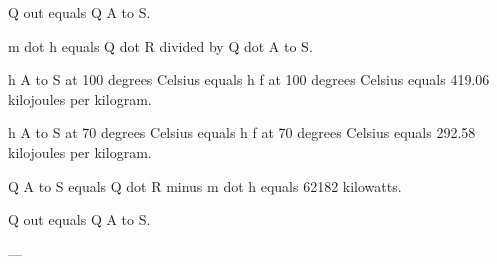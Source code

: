 Q out equals Q A to S.  

m dot h equals Q dot R divided by Q dot A to S.  

h A to S at 100 degrees Celsius equals h f at 100 degrees Celsius equals 419.06 kilojoules per kilogram.  

h A to S at 70 degrees Celsius equals h f at 70 degrees Celsius equals 292.58 kilojoules per kilogram.  

Q A to S equals Q dot R minus m dot h equals 62182 kilowatts.  

Q out equals Q A to S.  

---